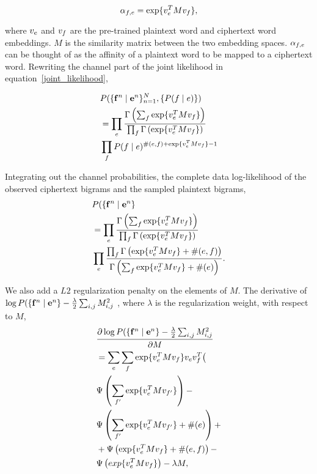 \begin{equation}
\alpha_{f,e} = \exp \{ v_{e}^T  M  v_{f} \},
\end{equation}

where $v_{e}$ and $v_{f}$ are the pre-trained plaintext word and ciphertext word embeddings.  $M$ is the similarity matrix between the two embedding spaces. $\alpha_{f,e}$ can be thought of as the affinity of a plaintext word to be mapped to a ciphertext word. Rewriting the channel part of the joint likelihood in equation~\ref{joint_likelihood}, 

\begin{align*}
&P( \{ \mathbf{f}^n \mid \mathbf{e}^n \}_{n=1}^{N}, \{ P(f \mid e) \})  \\
&=\prod_{e}  \frac{\Gamma \left( \sum_{f} \exp \{ v_{e}^T  M  v_{f} \}  \right)} {\prod_{f} \Gamma \left( \exp \{ v_{e}^T  M  v_{f} \} \right)} \\
& \prod_{f} P(f \mid e)^{\#(e,f)+ \exp \{ v_{e}^T  M  v_{f} \} -1} 
\end{align*}

Integrating out the channel probabilities, the complete data log-likelihood of the observed ciphertext bigrams and the sampled plaintext bigrams,
\begin{align*}
&P( \{ \mathbf{f}^n \mid \mathbf{e}^n \} \\
&= \prod_{e}  \frac{\Gamma \left( \sum_{f} \exp \{ v_{e}^T  M  v_{f} \}  \right)} {\prod_{f} \Gamma \left( \exp \{ v_{e}^T  M  v_{f} \} \right)} \\
& \prod_{e}  \frac{\prod_{f} \Gamma \left( \exp \{ v_{e}^T  M  v_{f} \} + \#(e,f) \right)} {\Gamma \left( \sum_{f} \exp \{ v_{e}^T  M  v_{f} \} + \#(e) \right)}.
\end{align*}

We also add a $L2$ regularization penalty on the elements of $M$. The derivative of $\log P( \{ \mathbf{f}^n \mid \mathbf{e}^n \} - \frac{\lambda}{2} \sum_{i,j} M_{i,j}^2$ , where $\lambda$ is the regularization weight, with respect to $M$,
\begin{align*}
&\frac {\partial \log P( \{ \mathbf{f}^n \mid \mathbf{e}^n \} - \frac{\lambda}{2} \sum_{i,j} M_{i,j}^2 }{\partial M}  \\
& = \sum_{e}  \sum_{f} \exp \{ v_{e}^T  M  v_{f}\}  v_{e} v_{f}^T \bigl( \\
& \Psi \left( \sum_{f'} \exp \{ v_{e}^ T M  v_{f'} \} \right) - \\
& \Psi \left( \sum_{f'} \exp \{ v_{e}^T  M  v_{f'} \} + \#(e) \right)  + \\
& + \Psi \left( \exp \{ v_{e}^T  M  v_{f} \} + \#(e,f) \right) - \\
& \Psi \left( exp \{ v_{e}^T  M  v_{f} \} \right) - \lambda  M, 
\end{align*}

